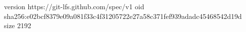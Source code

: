 version https://git-lfs.github.com/spec/v1
oid sha256:e02bcf8379e09a081f33c4f31205722e27a58c371fef939adadc45468542d19d
size 2192

